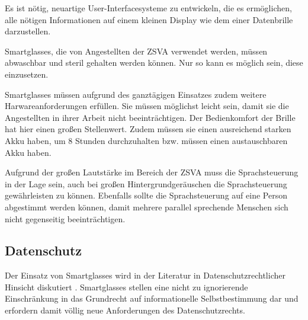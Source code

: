 Es ist nötig, neuartige User-Interfacesysteme zu entwickeln, die es ermöglichen, alle nötigen Informationen auf einem kleinen Display wie dem einer Datenbrille darzustellen. 

Smartglasses, die von Angestellten der ZSVA verwendet werden, müssen abwaschbar und steril gehalten werden können. Nur so kann es möglich sein, diese einzusetzen. 

Smartglasses müssen aufgrund des ganztägigen Einsatzes zudem weitere Harwareanforderungen erfüllen. Sie müssen möglichst leicht sein, damit sie die Angestellten in ihrer Arbeit nicht beeinträchtigen. Der Bedienkomfort der Brille hat hier einen großen Stellenwert. Zudem müssen sie einen ausreichend starken Akku haben, um 8 Stunden durchzuhalten bzw. müssen einen austauschbaren Akku haben.

Aufgrund der großen Lautstärke im Bereich der ZSVA muss die Sprachsteuerung in der Lage sein, auch bei großen Hintergrundgeräuschen die Sprachsteuerung gewährleisten zu können. Ebenfalls sollte die Sprachsteuerung auf eine Person abgestimmt werden können, damit mehrere parallel sprechende Menschen sich nicht gegenseitig beeinträchtigen.

%
%
\subsection{Datenschutz}
Der Einsatz von Smartglasses wird in der Literatur in Datenschutzrechtlicher Hinsicht diskutiert \cite{Berkemeier2017}. Smartglasses stellen eine nicht zu ignorierende Einschränkung in das Grundrecht auf informationelle Selbstbestimmung dar und erfordern damit völlig neue Anforderungen des Datenschutzrechts.

